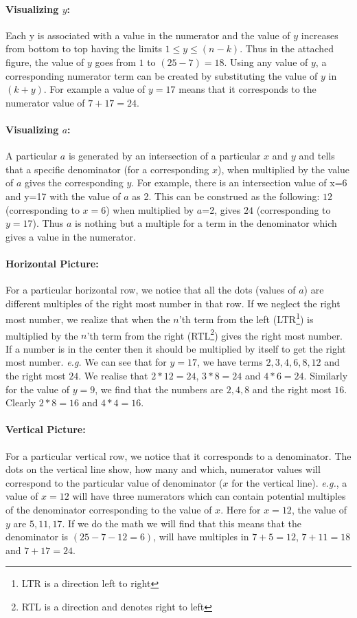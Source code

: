 \documentclass[10pt, twoside]{article}
\begin{document}
\paragraph{Visualizing $y$:}Each y is associated with a value in the numerator and the value of $y$ increases from bottom to top having the limits $1 \leq y \leq (n-k)$. Thus in the attached figure, the value of $y$ goes from $1$ to $(25-7)=18$. Using any value of $y$, a corresponding numerator term can be created by substituting the value of $y$ in $(k+y)$. For example a value of $y=17$ means that it corresponds to the numerator value of $7+17=24$.
\paragraph{Visualizing $a$:}A particular \textbf{$a$} is generated by an intersection of a particular $x$ and $y$ and tells that a specific denominator (for a corresponding $x$), when multiplied by the value of \textbf{$a$} gives the corresponding $y$. For example, there is an intersection value of x=6 and y=17 with the value of \textbf{$a$} as 2. This can be construed as the following: $12$ (corresponding to $x=6$) when multiplied by \textbf{$a$}=2, gives $24$ (corresponding to $y=17$). Thus \textbf{$a$} is nothing but a multiple for a term in the denominator which gives a value in the numerator.
\paragraph{Horizontal Picture:} For a particular horizontal row, we notice that all the dots (values of \textbf{$a$}) are different multiples of the right most number in that row. If we neglect the right most number, we realize that when the $n$'th term from the left (LTR\footnote{LTR is a direction left to right}) is multiplied by the $n$'th term from the right (RTL\footnote{RTL is a direction and denotes right to left}) gives the right most number. If a number is in the center then it should be multiplied by itself to get the right most number. \textit{e.g.} We can see that for $y=17$, we have terms $2, 3, 4, 6, 8, 12$ and the right most $24$. We realise that $2*12=24$, $3*8=24$ and $4*6=24$. Similarly for the value of $y=9$, we find that the numbers are $2, 4, 8$ and the right most $16$. Clearly $2*8=16$ and $4*4=16$.
\paragraph{Vertical Picture:} For a particular vertical row, we notice that it corresponds to a denominator. The dots on the vertical line show, how many and which, numerator values will correspond to the particular value of denominator ($x$ for the vertical line). \textit{e.g.}, a value of $x=12$ will have three numerators which can contain potential multiples of the denominator corresponding to the value of $x$. Here for $x=12$, the value of $y$ are $5, 11, 17$. If we do the math we will find that this means that the denominator is $(25-7-12=6)$, will have multiples in $7+5=12$, $7+11=18$ and $7+17=24$.
\end{document}
